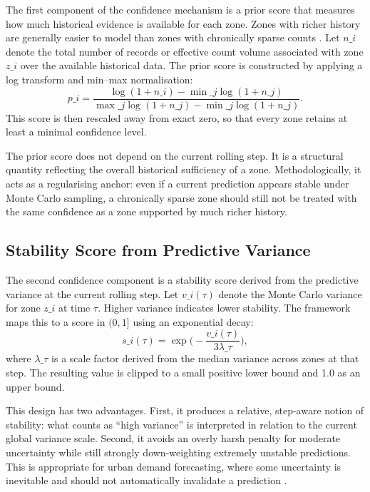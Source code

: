 \documentclass[12pt,a4paper]{report}
\begin{document}
The first component of the confidence mechanism is a prior score that measures how much historical evidence is available for each zone. Zones with richer history are generally easier to model than zones with chronically sparse counts \cite{zhuang2022sparse}. Let \(n\_i\) denote the total number of records or effective count volume associated with zone \(z\_i\) over the available historical data. The prior score is constructed by applying a log transform and min--max normalisation:
\[
p\_i
=
\frac{\log(1+n\_i)-\min\_j \log(1+n\_j)}
{\max\_j \log(1+n\_j)-\min\_j \log(1+n\_j)}.
\]
This score is then rescaled away from exact zero, so that every zone retains at least a minimal confidence level.

The prior score does not depend on the current rolling step. It is a structural quantity reflecting the overall historical sufficiency of a zone. Methodologically, it acts as a regularising anchor: even if a current prediction appears stable under Monte Carlo sampling, a chronically sparse zone should still not be treated with the same confidence as a zone supported by much richer history.

\subsection{Stability Score from Predictive Variance}

The second confidence component is a stability score derived from the predictive variance at the current rolling step. Let \(v\_i(\tau)\) denote the Monte Carlo variance for zone \(z\_i\) at time \(\tau\). Higher variance indicates lower stability. The framework maps this to a score in \((0,1]\) using an exponential decay:
\[
s\_i(\tau)
=
\exp\Big(
-\frac{v\_i(\tau)}{3\lambda\_\tau}
\Big),
\]
where \(\lambda\_\tau\) is a scale factor derived from the median variance across zones at that step. The resulting value is clipped to a small positive lower bound and 1.0 as an upper bound.

This design has two advantages. First, it produces a relative, step-aware notion of stability: what counts as ``high variance'' is interpreted in relation to the current global variance scale. Second, it avoids an overly harsh penalty for moderate uncertainty while still strongly down-weighting extremely unstable predictions. This is appropriate for urban demand forecasting, where some uncertainty is inevitable and should not automatically invalidate a prediction \cite{wang2024probgnn,gal2016dropout}.
\end{document}
